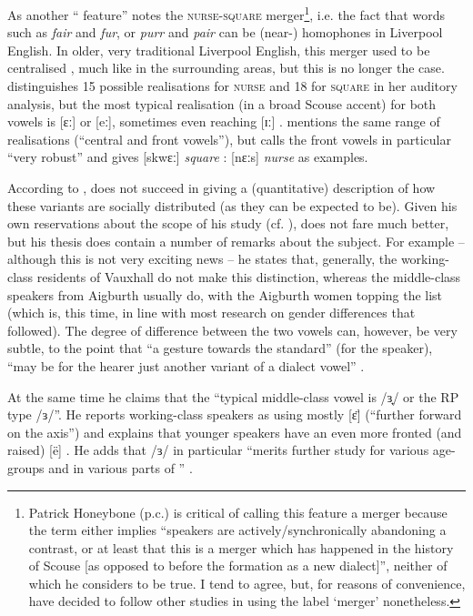 As another `` feature'' \citet[72]{trudgill1999} notes the \textsc{nurse}-\textsc{square} merger\footnote{Patrick Honeybone (p.c.) is critical of calling this feature a merger because the term either implies \enquote{speakers are actively/synchronically abandoning a contrast, or at least that this is a merger which has happened in the history of Scouse [as opposed to before the formation as a new dialect]}, neither of which he considers to be true. I tend to agree, but, for reasons of convenience, have decided to follow other studies \parencite{trudgill1999,watsonclark2013} in using the label \enquote*{merger} nonetheless.}, i.e. the fact that words such as \emph{fair} and \emph{fur}, or \emph{purr} and \emph{pair} can be (near-) homophones in Liverpool English.
In older, very traditional Liverpool English, this merger used to be centralised \parencite[cf.][323]{west2015}, much like in the surrounding areas, but this is no longer the case.
\citet[cf.][68 and 71]{delyon1981} distinguishes 15 possible realisations for \textsc{nurse} and 18 for \textsc{square} in her auditory analysis, but the most typical realisation (in a broad Scouse accent) for both vowels is [ɛː] or [eː], sometimes even reaching [ɪː] \citep[cf.][358]{watson2007}.
\citet[127]{honeybone2007} mentions the same range of realisations (``central and front vowels''), but calls the front vowels in particular ``very robust'' and gives [skwɛː] \emph{square} : [nɛːs] \emph{nurse} as examples.

According to \citet[358]{watson2007}, \textcite{delyon1981} does not succeed in giving a (quantitative) description of how these variants are socially distributed (as they can be expected to be).
Given his own reservations about the scope of his study (cf. ), \citet{knowles1973} does not fare much better, but his thesis does contain a number of remarks about the subject.
For example -- although this is not very exciting news -- he states that, generally, the working-class residents of Vauxhall do not make this distinction, whereas the middle-class speakers from Aigburth usually do, with the Aigburth women topping the list (which is, this time, in line with most research on gender differences that followed).
The degree of difference between the two vowels can, however, be very subtle, to the point that ``a gesture towards the  standard'' (for the speaker), ``may be for the hearer just another variant of a dialect vowel'' \citep[cf.][295--297]{knowles1973}.

At the same time he claims that the ``typical middle-class vowel is /ɜ̟/ or the RP type /ɜ/''. He reports working-class speakers as using mostly [ɛ̈] (``further forward on the axis'') and explains that younger speakers have an even more fronted (and raised) [ë] \citep[271]{knowles1973}.
He adds that /ɜ/ in particular ``merits further study for various age-groups and in various parts of '' \citeyearpar[320]{knowles1973}.

